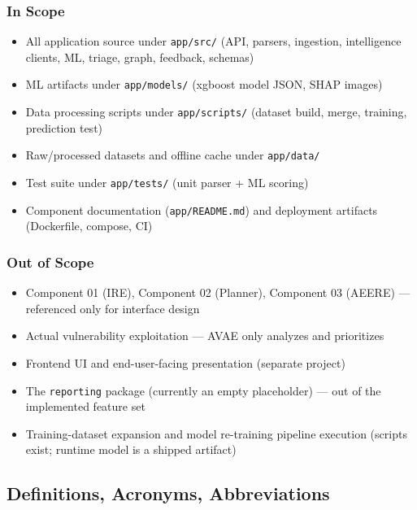 \documentclass[10pt,journal,onecolumn]{IEEEtran}
\begin{document}
\subsubsection{In Scope}

\begin{itemize}
\item All application source under \texttt{app/src/} (API, parsers, ingestion, intelligence clients, ML, triage, graph, feedback, schemas)
\item ML artifacts under \texttt{app/models/} (xgboost model JSON, SHAP images)
\item Data processing scripts under \texttt{app/scripts/} (dataset build, merge, training, prediction test)
\item Raw/processed datasets and offline cache under \texttt{app/data/}
\item Test suite under \texttt{app/tests/} (unit parser + ML scoring)
\item Component documentation (\texttt{app/README.md}) and deployment artifacts (Dockerfile, compose, CI)
\end{itemize}

\subsubsection{Out of Scope}

\begin{itemize}
\item Component 01 (IRE), Component 02 (Planner), Component 03 (AEERE) --- referenced only for interface design
\item Actual vulnerability exploitation --- AVAE only analyzes and prioritizes
\item Frontend UI and end-user-facing presentation (separate project)
\item The \texttt{reporting} package (currently an empty placeholder) --- out of the implemented feature set
\item Training-dataset expansion and model re-training pipeline execution (scripts exist; runtime model is a shipped artifact)
\end{itemize}

\subsection{Definitions, Acronyms, Abbreviations}
\end{document}
